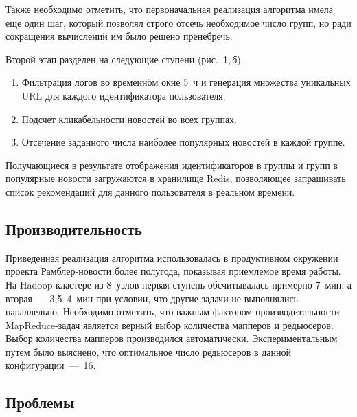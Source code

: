 \begin{multicols}{2}
   Также необходимо отметить, что первоначальная реализация алгоритма 
имела еще один шаг, который позволял строго отсечь необходимое число 
групп, но ради сокращения вычислений им было решено пренебречь.
   
   Второй этап разделен на следующие ступени (рис.~1,\,\textit{б}).
   \begin{enumerate}[1.]
\item Фильтрация логов во временн$\acute{\mbox{о}}$м окне 5~ч и генерация множества 
уникальных URL для каж\-до\-го идентификатора пользователя.
\item Подсчет кликабельности новостей во всех группах.
\item Отсечение заданного числа наиболее популярных новостей в каж\-дой 
группе.
\end{enumerate}

   Получающиеся в результате отображения идентификаторов в группы и групп 
в популярные ново\-сти загружаются в хранилище Redis, поз\-во\-ля\-ющее 
запрашивать список рекомендаций для данного пользователя в реальном 
времени.

\subsection{Производительность}

   Приведенная реализация алгоритма использовалась в продуктивном 
окружении проекта Рамб\-лер-но\-во\-сти более полугода, показывая 
приемлемое время работы. На Hadoop-клас\-те\-ре из 8~узлов первая ступень 
обсчитывалась примерно 7~мин, а вторая~--- 3,5--4~мин при условии, что 
другие задачи не выполнялись параллельно. Необходимо отметить, что важным 
фактором производительности MapReduce-за\-дач является верный выбор 
количества мапперов и редьюсеров. Выбор количества мапперов производился 
автоматически. Экспериментальным путем было выяснено, что оптимальное 
число редьюсеров в данной конфигурации~---~16.

\subsection{Проблемы}


\end{multicols}
